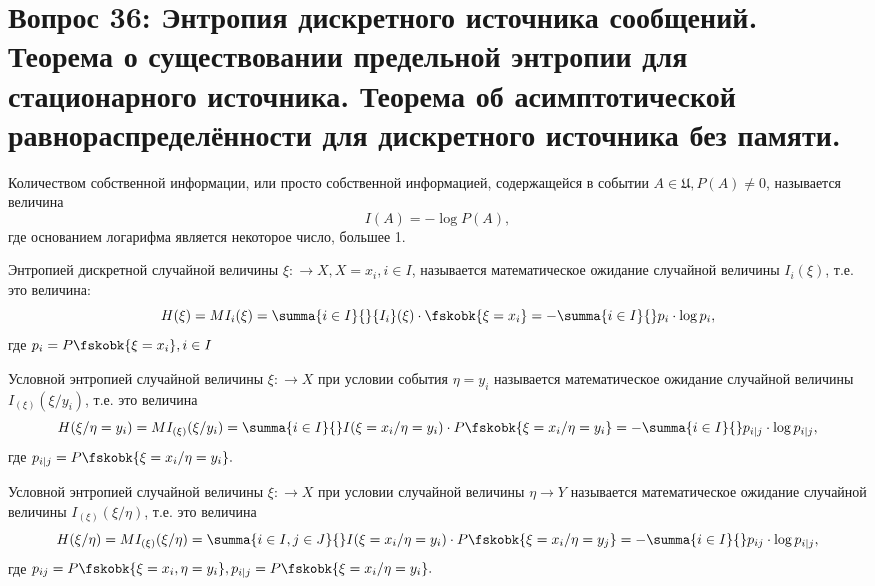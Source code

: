 \section{Вопрос 36:
Энтропия дискретного источника сообщений. Теорема о существовании предельной энтропии для стационарного источника. 
Теорема об асимптотической равнораспределённости для дискретного источника без памяти.
}

\begin{defs}
  Количеством собственной информации, или просто собственной информацией, содержащейся в событии $A \in \mathfrak{U}, P(A ) \neq 0$, называется величина
$${I}(A) = -\log{P(A)},$$
где основанием логарифма является некоторое число, большее 1.
\end{defs}

\begin{defs}[Энтропия]
  Энтропией дискретной случайной величины $\xi: \to X, X = {x_i, i \in I}$, называется математическое ожидание случайной величины $I_i(\xi)$, т.е. это величина:
$$H(\xi) = M{I_i}(\xi) = \summa{i \in I}{}{I_i}(\xi) \cdot \fskobk{\xi = x_i} = -\summa{i \in I}{}p_i \cdot \log{p_i},$$
где $p_i = P \fskobk{\xi = x_i}, i \in I$ 
\end{defs}

\begin{defs}
Условной энтропией случайной величины $\xi: \to X$ при условии события ${\eta = y_i}$ называется математическое ожидание случайной величины ${I_{{(\xi)}}}(\xi/y_i)$,
т.е. это величина
$$H(\xi/\eta = y_i) = M I_{(\xi)}(\xi/y_i) = \summa{i \in I}{} I(\xi = x_i/ \eta = y_i) \cdot P \fskobk{\xi = x_i/ \eta = y_i} = -\summa{i \in I}{} p_{i|j} \cdot \log{p_{i|j}},$$
где $p_{i|j} = P \fskobk{\xi = x_i/ \eta = y_i}.$
\end{defs}

\begin{defs}
Условной энтропией случайной величины $\xi: \to X$ при условии случайной величины ${\eta \to Y}$ называется математическое ожидание случайной величины ${I_{(\xi)}}(\xi/\eta)$,
т.е. это величина
$$H(\xi/\eta) = M{I_{(\xi)}}(\xi/\eta) = \summa{i \in I, j \in J}{} I(\xi = x_i/ \eta = y_i) \cdot P\fskobk{\xi = x_i/ \eta = y_j} = -\summa{i \in I}{} p_{ij} \cdot \log{p_{i|j}},$$
где $p_{ij} = P \fskobk{\xi = x_i, \eta = y_i}, p_{i|j} = P\fskobk{\xi = x_i/ \eta = y_i}.$
\end{defs}

